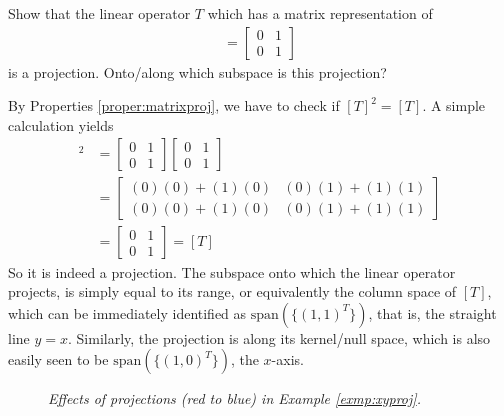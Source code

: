 \begin{exmp}
\label{exmp:xyproj}
Show that the linear operator $T$ which has a matrix representation of
\begin{align*}
[T] =
\begin{bmatrix}
0 & 1 \\
0 & 1 
\end{bmatrix}
\end{align*}
is a projection. Onto/along which subspace is this projection? 
\end{exmp}
\begin{solution}
By Properties \ref{proper:matrixproj}, we have to check if $[T]^2 = [T]$. A simple calculation yields
\begin{align*}
[T]^2 &=
\begin{bmatrix}
0 & 1 \\
0 & 1 
\end{bmatrix}
\begin{bmatrix}
0 & 1 \\
0 & 1 
\end{bmatrix} \\
&= 
\begin{bmatrix}
(0)(0) + (1)(0) & (0)(1) + (1)(1) \\
(0)(0) + (1)(0) & (0)(1) + (1)(1)
\end{bmatrix} \\
&= 
\begin{bmatrix}
0 & 1 \\
0 & 1 
\end{bmatrix} = [T]
\end{align*}
So it is indeed a projection. The subspace onto which the linear operator projects, is simply equal to its range, or equivalently the column space of $[T]$, which can be immediately identified as $\text{span}(\{(1,1)^T\})$, that is, the straight line $y=x$. Similarly, the projection is along its kernel/null space, which is also easily seen to be $\text{span}(\{(1,0)^T\})$, the $x$-axis.\par
\end{solution}

\begin{figure}[h!]
    \centering
    \caption{\textit{Effects of projections (red to blue) in Example \ref{exmp:xyproj}.}}
\end{figure}

